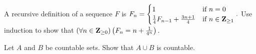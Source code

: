\documentclass[12pt,fleqn]{exam}
\begin{document}
\begin{questions}
\newpage



\newpage

\question [10]  A recursive definition of a sequence $F$ is
\(
  F_n = \begin{cases} 1  & \mbox{if } n = 0 \\ \frac{1}{4} F_{n-1} + \frac{3n+1}{4}  &\mbox{if } n \in \mathbf{Z}_{\geq 1} \end{cases}.
\)
Use induction to show that
\(
   \left(\forall n \in \mathbf{Z}_{\geq 0}\right) \left(F_n =  n + \frac{1}{4^n}  \right).
\)

\newpage

\question [10]  Let $A$ and $B$ be countable sets. Show that $A \cup B$ is countable.
\end{questions}
%     
\end{document}
